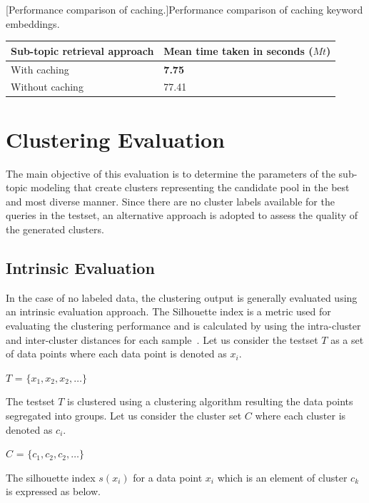 \begin{center}
	[Performance comparison of caching.]{Performance comparison of caching keyword embeddings.}\label{tab:cache_comparision}
	\begin{tabularx}{0.77\textwidth}{|Y|Y|}
		\hline
		 Sub-topic retrieval approach &  Mean time taken in seconds ($Mt$) \\
		\hline
	 With caching & \textbf{7.75} \\
		\hline
	 Without caching & 77.41 \\
		\hline
	\end{tabularx}
\end{center}


\section{Clustering Evaluation}

The main objective of this evaluation is to determine the parameters of the sub-topic modeling that create clusters representing the candidate pool in the best and most diverse manner. Since there are no cluster labels available for the queries in the testset, an alternative approach is adopted to assess the quality of the generated clusters.

	
	\subsection{Intrinsic Evaluation} In the case of no labeled data, the clustering output is generally evaluated using an intrinsic evaluation approach. The Silhouette index is a metric used for evaluating the clustering performance and is calculated by using the intra-cluster and inter-cluster distances for each sample~\cite{rousseeuw1987silhouettes, shutaywi2021silhouette}. Let us consider the testset $T$ as a set of data points where each data point is denoted as $x_i$.
		
		\centerline{$T$ = $\{x_1, x_2, x_2,\dots\}$}
		
		The testset $T$ is clustered using a clustering algorithm resulting the data points segregated into groups. Let us consider the cluster set $C$ where each cluster is denoted as $c_i$.
		
		\centerline{$C$ = $\{c_1, c_2, c_2,\dots\}$}
		
		The silhouette index $s(x_i)$ for a data point $x_i$ which is an element of cluster $c_k$ is expressed as below.\\
		

